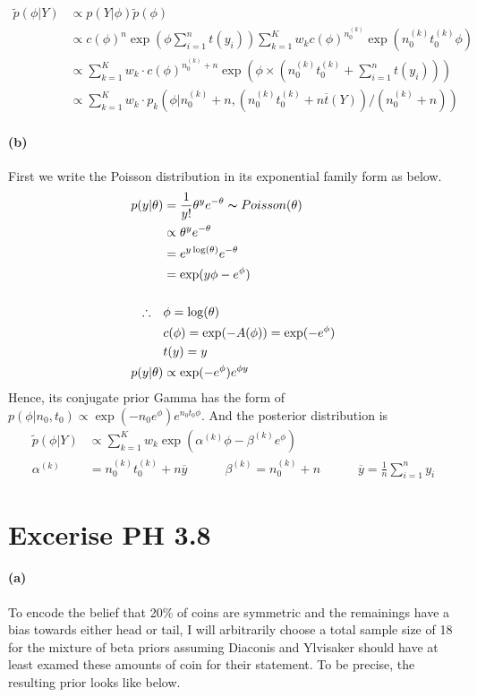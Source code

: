 \documentclass[11pt, letterpaper]{article}
\begin{document}
\begin{align*}
  \tilde{p}(\phi|Y) &\propto p(Y|\phi)\tilde{p}(\phi) \\
    &\propto {c(\phi)}^{n} \exp(\phi \sum_{i=1}^{n} t(y_i)) \sum_{k=1}^{K} w_k {c(\phi)}^{n_0^{(k)}} \exp(n_0^{(k)} t_0^{(k)} \phi) \\
    &\propto \sum_{k=1}^{K} w_k \cdot {c(\phi)}^{n_0^{(k)} + n} \exp(\phi \times (n_0^{(k)} t_0^{(k)} + \sum_{i=1}^{n} t(y_i))) \\
    &\propto \sum_{k=1}^{K} w_k \cdot p_k(\phi | n_0^{(k)}+n, (n_0^{(k)} t_0^{(k)} + n \overline{t}(Y)) / (n_0^{(k)} + n))
\end{align*}

\paragraph{(b)}
First we write the Poisson distribution in its exponential family form as below.
\begin{align*}
  p(y|\theta) &= \frac{1}{y!} \theta^y e^{-\theta} \thicksim Poisson(\theta) \\
    &\propto \theta^y e^{-\theta} \\
    &= e^{y \log(\theta)} e^{-\theta} \\
    &= \exp(y\phi - e^{\phi}) \\ \\
  \therefore \quad & \phi = \log(\theta) \\
    & c(\phi) = \exp({-A(\phi)}) = \exp(-e^{\phi}) \\
    & t(y) = y \\
  p(y|\theta) &\propto \exp(-e^{\phi}) e^{\phi y}
\end{align*}
Hence, its conjugate prior Gamma has the form of $p(\phi|n_0, t_0) \propto \exp(-n_0 e^{\phi}) e^{n_0 t_0 \phi}$.
And the posterior distribution is
\begin{align*}
  \tilde{p}(\phi|Y) &\propto \sum_{k=1}^{K} w_k \exp(\alpha^{(k)} \phi - \beta^{(k)} e^{\phi}) \\
    \alpha^{(k)} &= n_0^{(k)} t_0^{(k)} + n\overline{y} \qquad\quad \beta^{(k)} = n_0^{(k)} + n \qquad\quad \overline{y} = \frac{1}{n} \sum_{i=1}^{n} y_i
\end{align*}
\newpage


\section{Excerise PH 3.8}
\paragraph{(a)}
To encode the belief that 20\% of coins are symmetric and the remainings have a bias towards either head or tail, I
will arbitrarily choose a total sample size of 18 for the mixture of beta priors assuming Diaconis and Ylvisaker
should have at least examed these amounts of coin for their statement. To be precise, the resulting prior
looks like below.
\end{document}
